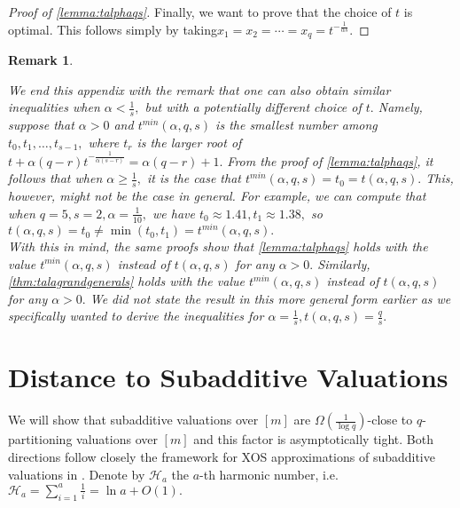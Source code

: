 \documentclass[11pt]{article}\usepackage{amsfonts}
\newtheorem{remark}[theorem]{Remark}
\numberwithin{theorem}{subsection}
\begin{document}
\begin{proof}[Proof of \cref{lemma:talphaqs}]
\noindent
Finally, we want to prove that the choice of $t$ is optimal. This follows simply by taking\linebreak $x_1 = x_2 = \cdots = x_q = t^{-\frac{1}{\alpha s}}.$ 
\end{proof}

\begin{remark}
\label{rmk:alphalessthansiso}
\normalfont

We end this appendix with the remark that one can also obtain similar inequalities when $\alpha <\frac{1}{s},$ but with a potentially different choice of $t.$ Namely, suppose that $\alpha >0$ and $t^{min}(\alpha ,q,s)$ is the smallest number among $t_0,t_1,\ldots, t_{s-1},$ where $t_r$ is the larger root of\linebreak $t + \alpha (q-r)t^{-\frac{1}{\alpha (s-r)}} = \alpha (q-r)+1.$ From the proof of \cref{lemma:talphaqs}, it follows that 
when $\alpha \ge\frac{1}{s},$ it is the case that $t^{min}(\alpha ,q,s) =t_0 = t(\alpha, q, s).$ This, however, might not be the case in general. For example, we can compute that when $q = 5, s = 2, \alpha = \frac{1}{10},$
we have $t_0 \approx 1.41, t_1\approx 1.38,$ so $t(\alpha ,q,s) = t_0\neq \min(t_0,t_1) = t^{min}(\alpha,q,s).$\\
 
\noindent
With this in mind, the same proofs show that \cref{lemma:talphaqs} holds with the value $t^{min}(\alpha,q,s)$ instead of $t(\alpha,q,s)$ for any $\alpha >0.$ Similarly,
\cref{thm:talagrandgenerals} holds 
with the value $t^{min}(\alpha,q,s)$ instead of $t(\alpha,q,s)$ for any $\alpha >0.$ We did not state the result in this more general form earlier as we specifically wanted to derive the inequalities for $\alpha = \frac{1}{s}, t(\alpha,q,s) = \frac{q}{s}.$ 
\end{remark}
\section{Distance to Subadditive Valuations}
\label{section:closeness}
We will show that subadditive valuations over $[m]$ are $\Omega(\frac{1}{\log q})$-close to $q$-partitioning valuations over $[m]$ and this factor is asymptotically tight. Both directions follow closely the framework for XOS 
approximations of subadditive valuations in \cite{BhawalkarR11}. Denote by $\mathcal{H}_a$ the $a$-th harmonic number, i.e. $\displaystyle\mathcal{H}_a = \sum_{i = 1}^a\frac{1}{i} = \ln a + O(1).$
\end{document}

